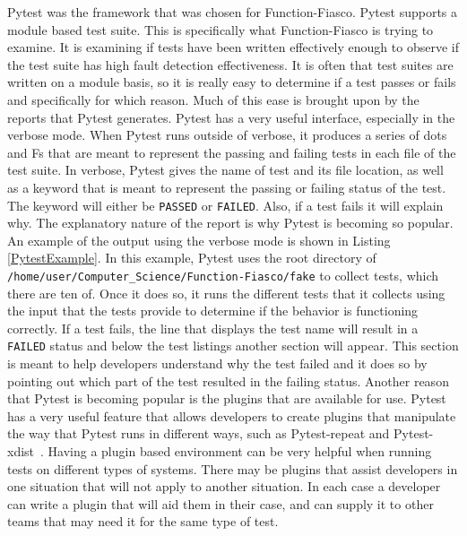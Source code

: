 Pytest was the framework that was chosen for Function-Fiasco. Pytest supports a module based test suite. This is specifically what Function-Fiasco is trying to examine. It is examining if tests have been written effectively enough to observe if the test suite has high fault detection effectiveness. It is often that test suites are written on a module basis, so it is really easy to determine if a test passes or fails and specifically for which reason. Much of this ease is brought upon by the reports that Pytest generates. Pytest has a very useful interface, especially in the verbose mode. When Pytest runs outside of verbose, it produces a series of dots and Fs that are meant to represent the passing and failing tests in each file of the test suite. In verbose, Pytest gives the name of test and its file location, as well as a keyword that is meant to represent the passing or failing status of the test. The keyword will either be \texttt{PASSED} or \texttt{FAILED}. Also, if a test fails it will explain why. The explanatory nature of the report is why Pytest is becoming so popular. An example of the output using the verbose mode is shown in Listing \ref{PytestExample}. In this example, Pytest uses the root directory of \texttt{/home/user/Computer\_Science/Function-Fiasco/fake} to collect tests, which there are ten of. Once it does so, it runs the different tests that it collects using the input that the tests provide to determine if the behavior is functioning correctly. If a test fails, the line that displays the test name will result in a \texttt{FAILED} status and below the test listings another section will appear. This section is meant to help developers understand why the test failed and it does so by pointing out which part of the test resulted in the failing status. Another reason that Pytest is becoming popular is the plugins that are available for use. Pytest has a very useful feature that allows developers to create plugins that manipulate the way that Pytest runs in different ways, such as Pytest-repeat and Pytest-xdist~\cite{okken_2018}. Having a plugin based environment can be very helpful when running tests on different types of systems. There may be plugins that assist developers in one situation that will not apply to another situation. In each case a developer can write a plugin that will aid them in their case, and can supply it to other teams that may need it for the same type of test.

